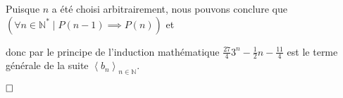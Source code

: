 \documentclass{article}
\newcommand{\tuple}[1]{\ensuremath{\left\langle #1 \right\rangle}}
\begin{document}
Puisque $n$ a été choisi arbitrairement, nous pouvons conclure que $(\forall n \in \mathbb{N}^{*} \mid P(n-1) \implies P(n))$ et 

donc par le principe de l'induction mathématique $\frac{27}{4}3^n - \frac{1}{2}n - \frac{11}{4}$ est le terme générale de la suite $\tuple{b_n}_{n \in \mathbb{N}}$.

\vspace{0.5cm}

$\hfill \square$
\end{document}
